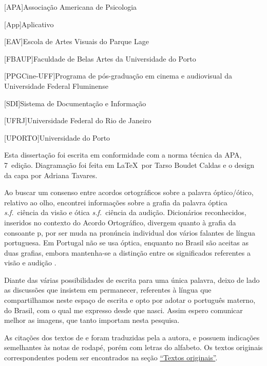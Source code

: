 \begin{acronym}
	[APA]{Associação Americana de Psicologia}

  [App]{Aplicativo}

	[EAV]{Escola de Artes Visuais do Parque Lage}

	[FBAUP]{Faculdade de Belas Artes da Universidade do Porto}

	[PPGCine-UFF]{Programa de pós-graduação em cinema e
		audiovisual da Universidade Federal Fluminense}

	[SDI]{Sistema de Documentação e Informação}

	[UFRJ]{Universidade Federal do Rio de Janeiro}

	[UPORTO]{Universidade do Porto}
\end{acronym}

\clearpage

\begin{authornote}
	Esta dissertação foi escrita em conformidade com a norma técnica da
	APA, 7\textordfeminine~edição. Diagramação foi feita em \LaTeX\ por Tarso Boudet Caldas e 
  o design da capa por Adriana Tavares.

	Ao buscar um consenso entre acordos ortográficos sobre a palavra
	óptico/ótico, relativo ao olho, encontrei informações sobre a grafia da
	palavra óptica \emph{s.f.}~ciência da visão e ótica \emph{s.f.}~ciência
	da audição. Dicionários reconhecidos, inseridos no contexto do Acordo
	Ortográfico, divergem quanto à grafia da consoante p, por ser muda na
	pronúncia individual dos vários falantes de língua portuguesa. Em
	Portugal não se usa óptica, enquanto no Brasil são aceitas as duas
	grafias, embora mantenha-se a distinção entre os significados
	referentes a visão e audição \parencite{ILLLP2015optico}.

	Diante das várias possibilidades de escrita para uma única palavra,
	deixo de lado as discussões que insistem em permanecer, referentes à
	língua que compartilhamos neste espaço de escrita e opto por adotar o
	português materno, do Brasil, com o qual me expresso desde que nasci.
	Assim espero comunicar melhor as imagens, que tanto importam nesta
	pesquisa.

  As citações dos textos de \citeauthor{gardies2019espaco} e 
  \citeauthor{block2013visual} foram traduzidas pela a autora, 
  e possuem indicações semelhantes às notas de rodapé, porém com 
  letras do alfabeto. Os textos originais correspondentes podem ser encontrados
  na seção \hyperref[sec:textos-originais]{\enquote{Textos originais}}.
\end{authornote}
